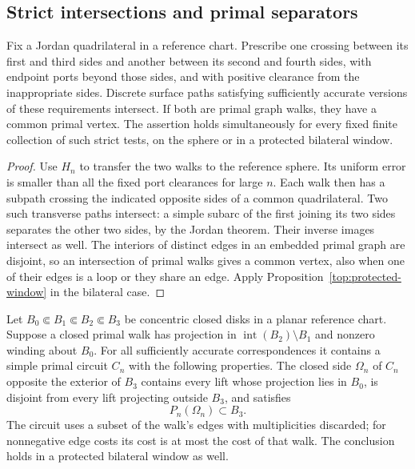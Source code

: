 \subsection{Strict intersections and primal separators}

\begin{corollary}\label{top:transverse}
Fix a Jordan quadrilateral in a reference chart.  Prescribe one
crossing between its first and third sides and another between its
second and fourth sides, with endpoint ports beyond those sides,
and with positive clearance from the inappropriate sides.  Discrete
surface paths satisfying sufficiently accurate versions of these
requirements intersect.  If both are primal graph walks, they
have a common primal vertex.  The assertion holds simultaneously
for every fixed finite collection of such strict tests, on the
sphere or in a protected bilateral window.
\end{corollary}

\begin{proof}
Use $H_n$ to transfer the two walks to the reference sphere.  Its
uniform error is smaller than all the fixed port clearances for
large $n$.  Each walk then has a subpath crossing the indicated
opposite sides of a common quadrilateral.  Two such transverse
paths intersect: a simple subarc of the first joining its two
sides separates the other two sides, by the Jordan theorem.
Their inverse images intersect as well.  The interiors of
distinct edges in an embedded primal graph are disjoint, so an
intersection of primal walks gives a common vertex, also when
one of their edges is a loop or they share an edge.  Apply
Proposition~\ref{top:protected-window} in the bilateral case.
\end{proof}

\begin{corollary}\label{top:circuits}
Let $B_0\Subset B_1\Subset B_2\Subset B_3$ be concentric closed
disks in a planar reference chart.  Suppose a closed primal walk
has projection in $\operatorname{int}(B_2)\setminus B_1$ and
nonzero winding about $B_0$.  For all sufficiently accurate
correspondences it contains a simple primal circuit $C_n$ with
the following properties.  The closed side $\Omega_n$ of $C_n$
opposite the exterior of $B_3$ contains every lift whose projection
lies in $B_0$, is disjoint from every lift projecting outside $B_3$,
and satisfies
\[
 P_n(\Omega_n)\subset B_3.
\]
The circuit uses a subset of the walk's edges with multiplicities
discarded; for nonnegative edge costs its cost is at most the
cost of that walk.  The conclusion holds in a protected bilateral
window as well.
\end{corollary}

